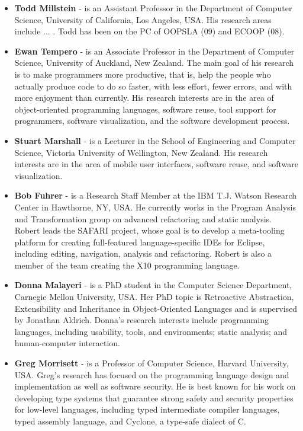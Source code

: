 \documentclass{acm_proc_article-sp}
\begin{document}
\begin{itemize}
\item \textbf{Todd Millstein} - is an Assistant Professor in the Department of Computer Science, University of California, Los Angeles, USA. His research areas include ... . Todd has been on the PC of OOPSLA (09) and ECOOP (08).

\item \textbf{Ewan Tempero} - is an Associate Professor in the Department of Computer Science, University of Auckland, New Zealand. The main goal of his research is to make programmers more productive, that is, help the people who actually produce code to do so faster, with less effort, fewer errors, and with more enjoyment than currently. His research interests are in the area of object-oriented programming languages, software reuse, tool support for programmers, software visualization, and the software development process.

\item \textbf{Stuart Marshall} - is a Lecturer in the School of Engineering and Computer Science, Victoria University of Wellington, New Zealand. His research interests are in the area of mobile user interfaces, software reuse, and software visualization.

\item \textbf{Bob Fuhrer} - is a Research Staff Member at the IBM T.J. Watson Research Center in Hawthorne, NY, USA. He currently works in the Program Analysis and Transformation group on advanced refactoring and static analysis. Robert leads the SAFARI project, whose goal is to develop a meta-tooling platform for creating full-featured language-specific IDEs for Eclipse, including editing, navigation, analysis and refactoring. Robert is also a member of the team creating the X10 programming language.

\item \textbf{Donna Malayeri} - is a PhD student in the Computer Science Department, Carnegie Mellon University, USA. Her PhD topic is Retroactive Abstraction, Extensibility and Inheritance in Object-Oriented Languages and is supervised by Jonathan Aldrich. Donna's research interests include programming languages, including usability, tools, and environments; static analysis;  and human-computer interaction. 

\item \textbf{Greg Morrisett} - is a Professor of Computer Science, Harvard University, USA. Greg's research has focused on the programming language design and implementation as well as software security.  He is best known for his work on developing type systems that guarantee strong safety and security properties for low-level languages, including typed intermediate compiler languages, typed assembly language, and Cyclone, a type-safe dialect of C.


\end{itemize}
\end{document}
